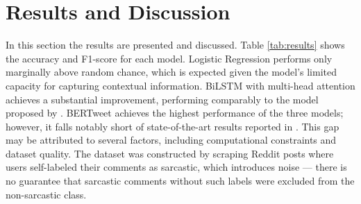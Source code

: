\documentclass[
 reprint,
 amsmath,amssymb,
 aps,
]{revtex4-2}
\begin{document}






\section{\label{sec:results}Results and Discussion} %
\noindent
In this section the results are presented and discussed. Table \ref{tab:results} shows the accuracy and F1-score for each model. Logistic Regression performs only marginally above random chance, which is expected given the model's limited capacity for capturing contextual information. BiLSTM with multi-head attention achieves a substantial improvement, performing comparably to the model proposed by \cite{KumarEtAl2021}. BERTweet achieves the highest performance of the three models; however, it falls notably short of state-of-the-art results reported in \cite{SharmaEtAl2026}. This gap may be attributed to several factors, including computational constraints and dataset quality. The dataset was constructed by scraping Reddit posts where users self-labeled their comments as sarcastic, which introduces noise — there is no guarantee that sarcastic comments without such labels were excluded from the non-sarcastic class.
\end{document}
